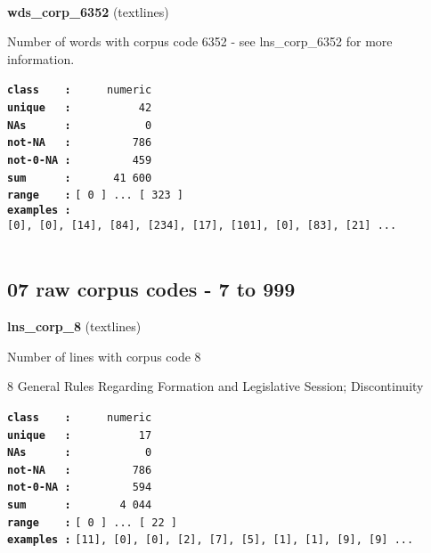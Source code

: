 \documentclass[]{article}
\begin{document}
~

\textbf{wds\_corp\_6352} (textlines)

Number of words with corpus code 6352 - see lns\_corp\_6352 for more
information.

\textbf{\texttt{class\ \ \ \ :}} \texttt{~~~~~numeric}\\
\textbf{\texttt{unique\ \ \ :}} \texttt{~~~~~~~~~~42}\\
\textbf{\texttt{NAs\ \ \ \ \ \ :}} \texttt{~~~~~~~~~~~0}\\
\textbf{\texttt{not-NA\ \ \ :}} \texttt{~~~~~~~~~786}\\
\textbf{\texttt{not-0-NA\ :}} \texttt{~~~~~~~~~459}\\
\textbf{\texttt{sum\ \ \ \ \ \ :}} \texttt{~~~~~~41~600}\\
\textbf{\texttt{range\ \ \ \ :}}
\texttt{{[}\ 0\ {]}\ ...\ {[}\ 323\ {]}}\\
\textbf{\texttt{examples\ :}}
\texttt{{[}0{]},\ {[}0{]},\ {[}14{]},\ {[}84{]},\ {[}234{]},\ {[}17{]},\ {[}101{]},\ {[}0{]},\ {[}83{]},\ {[}21{]}\ ...}\\

~

\subsection{07 raw corpus codes - 7 to
999}\label{raw-corpus-codes---7-to-999}

\textbf{lns\_corp\_8} (textlines)

Number of lines with corpus code 8

8 General Rules Regarding Formation and Legislative Session;
Discontinuity

\textbf{\texttt{class\ \ \ \ :}} \texttt{~~~~~numeric}\\
\textbf{\texttt{unique\ \ \ :}} \texttt{~~~~~~~~~~17}\\
\textbf{\texttt{NAs\ \ \ \ \ \ :}} \texttt{~~~~~~~~~~~0}\\
\textbf{\texttt{not-NA\ \ \ :}} \texttt{~~~~~~~~~786}\\
\textbf{\texttt{not-0-NA\ :}} \texttt{~~~~~~~~~594}\\
\textbf{\texttt{sum\ \ \ \ \ \ :}} \texttt{~~~~~~~4~044}\\
\textbf{\texttt{range\ \ \ \ :}}
\texttt{{[}\ 0\ {]}\ ...\ {[}\ 22\ {]}}\\
\textbf{\texttt{examples\ :}}
\texttt{{[}11{]},\ {[}0{]},\ {[}0{]},\ {[}2{]},\ {[}7{]},\ {[}5{]},\ {[}1{]},\ {[}1{]},\ {[}9{]},\ {[}9{]}\ ...}\\
\end{document}
